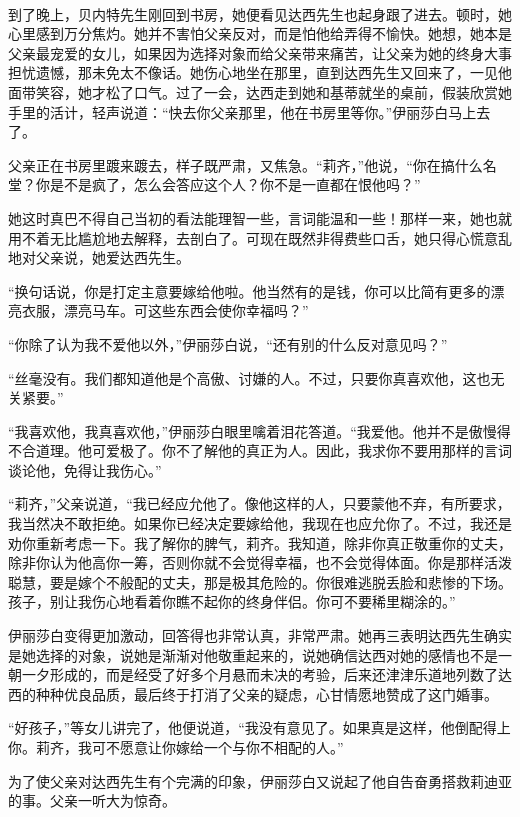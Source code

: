 \par  
\par 到了晚上，贝内特先生刚回到书房，她便看见达西先生也起身跟了进去。顿时，她心里感到万分焦灼。她并不害怕父亲反对，而是怕他给弄得不愉快。她想，她本是父亲最宠爱的女儿，如果因为选择对象而给父亲带来痛苦，让父亲为她的终身大事担忧遗憾，那未免太不像话。她伤心地坐在那里，直到达西先生又回来了，一见他面带笑容，她才松了口气。过了一会，达西走到她和基蒂就坐的桌前，假装欣赏她手里的活计，轻声说道：“快去你父亲那里，他在书房里等你。”伊丽莎白马上去了。
\par 父亲正在书房里踱来踱去，样子既严肃，又焦急。“莉齐，”他说，“你在搞什么名堂？你是不是疯了，怎么会答应这个人？你不是一直都在恨他吗？”
\par 她这时真巴不得自己当初的看法能理智一些，言词能温和一些！那样一来，她也就用不着无比尴尬地去解释，去剖白了。可现在既然非得费些口舌，她只得心慌意乱地对父亲说，她爱达西先生。
\par “换句话说，你是打定主意要嫁给他啦。他当然有的是钱，你可以比简有更多的漂亮衣服，漂亮马车。可这些东西会使你幸福吗？”
\par “你除了认为我不爱他以外，”伊丽莎白说，“还有别的什么反对意见吗？”
\par “丝毫没有。我们都知道他是个高傲、讨嫌的人。不过，只要你真喜欢他，这也无关紧要。”
\par “我喜欢他，我真喜欢他，”伊丽莎白眼里噙着泪花答道。“我爱他。他并不是傲慢得不合道理。他可爱极了。你不了解他的真正为人。因此，我求你不要用那样的言词谈论他，免得让我伤心。”
\par “莉齐，”父亲说道，“我已经应允他了。像他这样的人，只要蒙他不弃，有所要求，我当然决不敢拒绝。如果你已经决定要嫁给他，我现在也应允你了。不过，我还是劝你重新考虑一下。我了解你的脾气，莉齐。我知道，除非你真正敬重你的丈夫，除非你认为他高你一筹，否则你就不会觉得幸福，也不会觉得体面。你是那样活泼聪慧，要是嫁个不般配的丈夫，那是极其危险的。你很难逃脱丢脸和悲惨的下场。孩子，别让我伤心地看着你瞧不起你的终身伴侣。你可不要稀里糊涂的。”
\par 伊丽莎白变得更加激动，回答得也非常认真，非常严肃。她再三表明达西先生确实是她选择的对象，说她是渐渐对他敬重起来的，说她确信达西对她的感情也不是一朝一夕形成的，而是经受了好多个月悬而未决的考验，后来还津津乐道地列数了达西的种种优良品质，最后终于打消了父亲的疑虑，心甘情愿地赞成了这门婚事。
\par “好孩子，”等女儿讲完了，他便说道，“我没有意见了。如果真是这样，他倒配得上你。莉齐，我可不愿意让你嫁给一个与你不相配的人。”
\par 为了使父亲对达西先生有个完满的印象，伊丽莎白又说起了他自告奋勇搭救莉迪亚的事。父亲一听大为惊奇。
